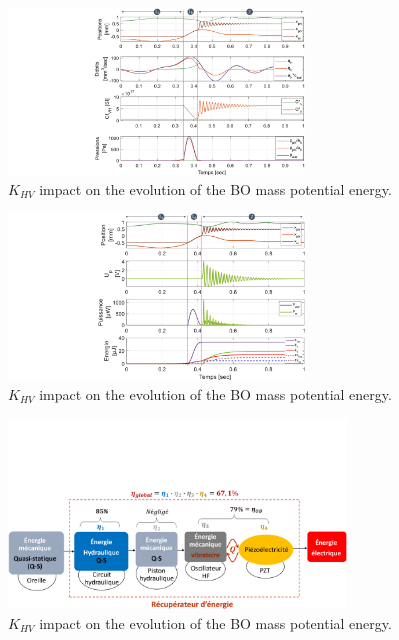 \documentclass[3p,twocolumn,preprint]{elsarticle}
\begin{document}
\label{NUMERICAL MODEL AND SIMULATIONS}
\lipsum[1]
\begin{figure}[!htbp]
	\centering
	\captionsetup{justification=centering}
	\includegraphics[trim={9.5cm 0cm 0cm 0cm},clip, width=0.7\textwidth]{figures/simu_pos_debit_Cf_pression_1CYCLE.pdf}
	\caption{$K_{HV}$ impact on the evolution of the BO mass potential energy.}
	\label{fig:simu_pos_debit_Cf_pression_1CYCLE}
\end{figure}
\lipsum[1]
\begin{figure}[!htbp]
	\centering
	\captionsetup{justification=centering}
	\includegraphics[trim={10cm 0cm 0cm 0cm},clip, width=0.7\textwidth]{figures/simu_pos_Up_puissances_energie_1CYCLE.pdf}
	\caption{$K_{HV}$ impact on the evolution of the BO mass potential energy.}
	\label{fig:simu_pos_Up_puissances_energie_1CYCLE}
\end{figure}
\begin{figure}[!htbp]
	\centering
	\captionsetup{justification=centering}
	\includegraphics[trim={0cm 0cm 0cm 7cm},clip, width=0.8\textwidth]{figures/conversion_symme_rendements.pdf}
	\caption{$K_{HV}$ impact on the evolution of the BO mass potential energy.}
	\label{fig:conversion_symme_rendements.pdf}
\end{figure}
\end{document}
